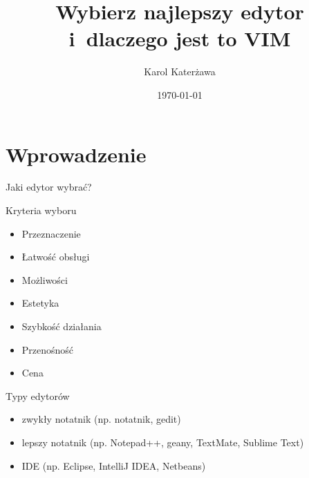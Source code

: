 \documentclass{beamer}
\title[VIM]{Wybierz najlepszy edytor\\i~dlaczego jest to VIM} %
\author{Karol Katerżawa} %
\institute[IAiIS] %
{
Instytut Automatyki i~Informatyki Stosowanej \\ %
\medskip
\textit{\textbf{Promotor:} dr~inż. Tomasz Kornuta} %
}
\date{\today} %
\begin{document}
\begin{frame}
\titlepage %
\end{frame}



\section{Wprowadzenie}
\label{sec:Wprowadzenie}

\begin{frame}[t]{Jaki edytor wybrać?}
  \begin{block}{Kryteria wyboru}
    \begin{itemize}
      \item Przeznaczenie
      \item Łatwość obsługi
      \item Możliwości
      \item Estetyka
      \item Szybkość działania
      \item Przenośność
      \item Cena
    \end{itemize}
  \end{block}
\end{frame}

\begin{frame}[t]{Typy edytorów}
  \begin{itemize}
    \item zwykły notatnik (np. notatnik, gedit)
    \item lepszy notatnik (np. Notepad++, geany, TextMate, Sublime Text)
    \item IDE (np. Eclipse, IntelliJ IDEA, Netbeans)
  \end{itemize}
\end{frame}
\end{document}
